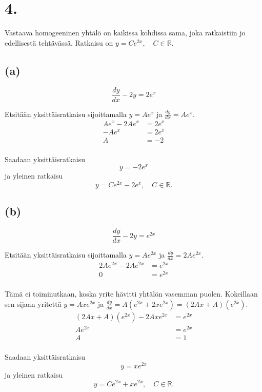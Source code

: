 \documentclass{article}
\begin{document}
\section*{4.}

Vastaava homogeeninen yhtälö on kaikissa kohdissa sama, joka ratkaistiin jo
edellisestä tehtävässä. Ratkaisu on $y = Ce^{2x}, \quad C \in \mathbb{R}$.

\subsection*{(a)}

\[
  \frac{dy}{dx} - 2y = 2e^x
\]

Etsitään yksittäisratkaisu sijoittamalla $y = Ae^x$ ja $\frac{dy}{dx} = Ae^x$.
\begin{align*}
  Ae^x - 2Ae^x &= 2e^x \\
  -Ae^x &= 2e^x \\
  A &= -2 \\
\end{align*}

Saadaan yksittäisratkaisu
\[
  y = -2e^x
\]
ja yleinen ratkaisu
\[
  y = Ce^{2x} - 2e^x, \quad C \in \mathbb{R}.
\]

\subsection*{(b)}

\[
  \frac{dy}{dx} - 2y = e^{2x}
\]

Etsitään yksittäisratkaisu sijoittamalla $y = Ae^{2x}$ ja $\frac{dy}{dx} = 2Ae^{2x}$.
\begin{align*}
  2Ae^{2x} - 2Ae^{2x} &= e^{2x} \\
  0 &= e^{2x} \\
\end{align*}

Tämä ei toiminutkaan, koska yrite hävitti yhtälön vasemman puolen. Kokeillaan
sen sijaan yritettä $y = Axe^{2x}$ ja $\frac{dy}{dx} = A(e^{2x} + 2xe^{2x}) =
(2Ax + A)(e^{2x})$.
\begin{align*}
  (2Ax + A)(e^{2x}) - 2Axe^{2x} &= e^{2x} \\
  Ae^{2x} &= e^{2x} \\
  A &= 1 \\
\end{align*}

Saadaan yksittäisratkaisu
\[
  y = xe^{2x}
\]
ja yleinen ratkaisu
\[
  y = Ce^{2x} + xe^{2x}, \quad C \in \mathbb{R}.
\]
\end{document}
